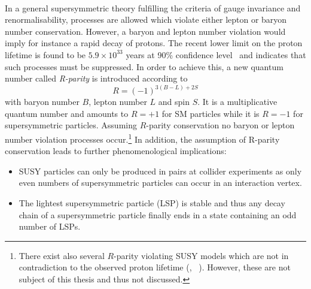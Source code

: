 \\
In a general supersymmetric theory fulfilling the criteria of gauge invariance and renormalisability, processes are allowed which violate either lepton or baryon number conservation. However, a baryon and lepton number violation would imply for instance a rapid decay of protons. The recent lower limit on the proton lifetime is found to be $5.9 \times 10^{33}$ years at 90\% confidence level~\cite{PhysRevD.90.072005} and indicates that such processes must be suppressed. In order to achieve this, a new quantum number called \textit{R-parity} is introduced according to  
\begin{equation*}
R = (-1)^{3(B-L) + 2S}
\end{equation*}
with baryon number $B$, lepton number $L$ and spin $S$. It is a multiplicative quantum number and amounts to $R= +1$ for SM particles while it is $R = -1$ for supersymmetric particles. Assuming $R$-parity conservation no baryon or lepton number violation processes occur.\footnote{There exist also several $R$-parity violating SUSY models which are not in contradiction to the observed proton lifetime (\cf, \eg~\cite{Martin:1997ns}). However, these are not subject of this thesis and thus not discussed.} In addition, the assumption of R-parity conservation leads to further phenomenological implications:
\begin{itemize}
\item SUSY particles can only be produced in pairs at collider experiments as only even numbers of supersymmetric particles can occur in an interaction vertex.
\item The lightest supersymmetric particle (LSP) is stable and thus any decay chain of a supersymmetric particle finally ends in a state containing an odd number of LSPs.
\end{itemize}
